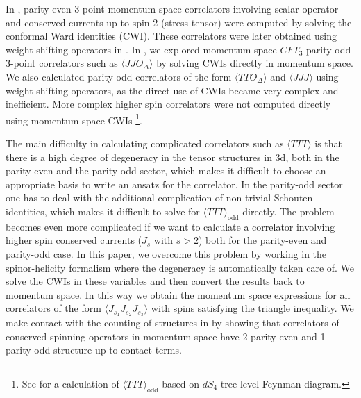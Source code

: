 \documentclass[a4paper,11pt]{article}
\begin{document}
In \cite{Bzowski:2013sza}, parity-even 3-point momentum space correlators involving scalar operator and conserved currents up to spin-2 (stress tensor) were computed by solving the conformal Ward identities (CWI). These correlators were later obtained using weight-shifting operators in \cite{Baumann:2019oyu,Baumann:2020dch}. In \cite{Jain:2021wyn}, we explored  momentum space $CFT_3$ parity-odd  3-point correlators such as $\langle JJO_\Delta\rangle$  by solving CWIs directly in momentum space. We also calculated parity-odd correlators of the form $\langle TTO_\Delta \rangle$ and $\langle JJJ \rangle$ using weight-shifting operators, as the  direct use of CWIs became very complex and inefficient. More complex higher spin correlators were not computed directly using momentum space CWIs \footnote{See \cite{Maldacena:2011nz} for a calculation of $\langle TTT\rangle_{\text{odd}}$ based on $dS_4$ tree-level Feynman diagram.}. 

The main difficulty in calculating complicated correlators such as  $\langle TTT\rangle$ is that 
 there is a high degree of degeneracy in the tensor structures in 3d, both in the parity-even and the parity-odd sector, which makes it difficult to choose an appropriate basis to write an ansatz for the correlator. In the parity-odd sector one has to deal with the additional complication of non-trivial Schouten identities, which makes it difficult to solve for $\langle TTT\rangle_{\text{odd}}$ directly. The problem becomes even more complicated if we want to calculate a correlator involving higher spin conserved currents ($J_s$ with $s > 2$) both for the parity-even and parity-odd case.  In this paper, we overcome this problem by working in the spinor-helicity formalism where the degeneracy is automatically taken care of. We solve the CWIs in these variables and then convert the results back to momentum space. In this way we obtain the momentum space expressions for all correlators of the form $\langle J_{s_1}J_{s_2} J_{s_3}\rangle$ with spins satisfying the triangle inequality. We make contact with the counting of structures in \cite{Giombi:2011rz} by showing that correlators of conserved spinning operators in momentum space  have 2 parity-even and 1 parity-odd structure up to contact terms. 
\end{document}
